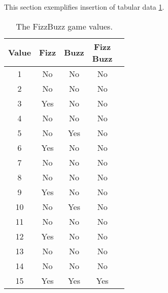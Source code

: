 
This section exemplifies insertion of tabular data \ref{tbl:tbl}.

\begin{table}[!ht]
  \centering
  \begin{tabular}{| c | c | c | c | c |}
    \hline
    \textbf{Value} & \textbf{Fizz} & \textbf{Buzz} & \specialcell[t]{\textbf{Fizz} \\ \textbf{Buzz}} \\ \hline \hline
    1 & No & No & No \\ \hline
    2 & No & No & No \\ \hline
    3 & Yes & No & No \\ \hline
    4 & No & No & No \\ \hline
    5 & No & Yes & No \\ \hline
    6 & Yes & No & No \\ \hline
    7 & No & No & No \\ \hline
    8 & No & No & No \\ \hline
    9 & Yes & No & No \\ \hline
    10 & No & Yes & No \\ \hline
    11 & No & No & No \\ \hline
    12 & Yes & No & No \\ \hline
    13 & No & No & No \\ \hline
    14 & No & No & No \\ \hline
    15 & Yes & Yes & Yes \\ \hline
  \end{tabular}
  \caption{The FizzBuzz game values.}
  \label{tbl:tbl}
\end{table}
